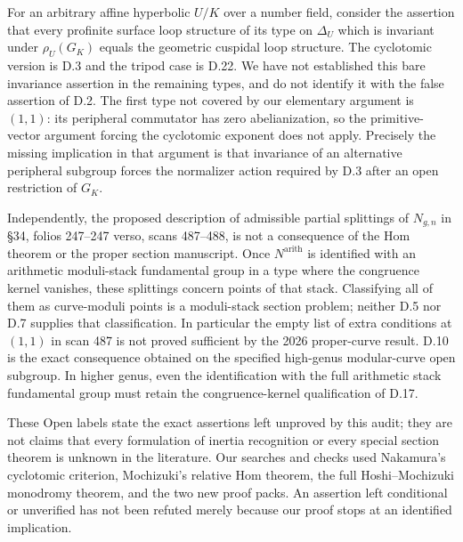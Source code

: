 For an arbitrary affine hyperbolic $U/K$ over a number field, consider the
assertion that every profinite surface loop structure of its type on
$\Delta_U$ which is invariant under $\rho_U(G_K)$ equals the geometric
cuspidal loop structure.  The cyclotomic version is D.3 and the tripod case
is D.22.  We have not established this bare invariance assertion in the
remaining types, and do not identify it with the false assertion of D.2.
The first type not covered by our elementary argument is $(1,1)$: its
peripheral commutator has zero abelianization, so the primitive-vector
argument forcing the cyclotomic exponent does not apply.
Precisely the missing implication in that argument is that invariance of
an alternative peripheral subgroup forces the normalizer action required
by D.3 after an open restriction of $G_K$.

Independently, the proposed description of admissible partial splittings
of $N_{g,n}$ in \S34, folios 247--247 verso, scans 487--488, is not a
consequence of the Hom theorem or the proper section manuscript.
Once $N^{\mathrm{arith}}$ is identified with an arithmetic moduli-stack
fundamental group in a type where the congruence kernel vanishes, these
splittings concern points of that stack.  Classifying all of them as
curve-moduli points is a moduli-stack section problem; neither D.5 nor
D.7 supplies that classification.  In particular the empty list of
extra conditions at $(1,1)$ in scan 487 is not proved sufficient by the
2026 proper-curve result.  D.10 is the exact consequence obtained on the
specified high-genus modular-curve open subgroup.  In higher genus, even
the identification with the full arithmetic stack fundamental group must
retain the congruence-kernel qualification of D.17.

These Open labels state the exact assertions left unproved by this audit;
they are not claims that every formulation of inertia recognition or every
special section theorem is unknown in the literature.  Our searches and
checks used Nakamura's cyclotomic criterion, Mochizuki's relative Hom theorem,
the full Hoshi--Mochizuki monodromy theorem, and the two new proof packs.
An assertion left conditional or unverified has not been refuted merely
because our proof stops at an identified implication.
